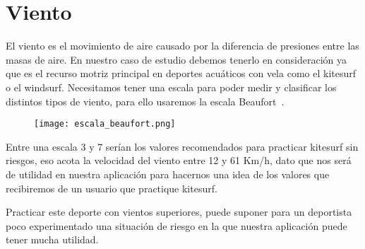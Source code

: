 \section{Viento}

El viento es el movimiento de aire causado por la diferencia de presiones entre las masas de aire. En nuestro caso de estudio debemos tenerlo en consideración ya que es el recurso motriz principal en deportes acuáticos con vela como el kitesurf o el windsurf. Necesitamos tener una escala para poder medir y clasificar los distintos tipos de viento, para ello usaremos la escala Beaufort~\cite{BEAUFORT}.

\begin{figure}[hb]
  \texttt{[image: escala\_beaufort.png]} 
\end{figure}

Entre una escala 3 y 7 serían los valores recomendados para practicar kitesurf sin riesgos, eso acota la velocidad del viento entre 12 y 61 Km/h, dato que nos será de utilidad en nuestra aplicación para hacernos una idea de los valores que recibiremos de un usuario que practique kitesurf. 

Practicar este deporte con vientos superiores, puede suponer para un deportista poco experimentado una situación de riesgo en la que nuestra aplicación puede tener mucha utilidad.
